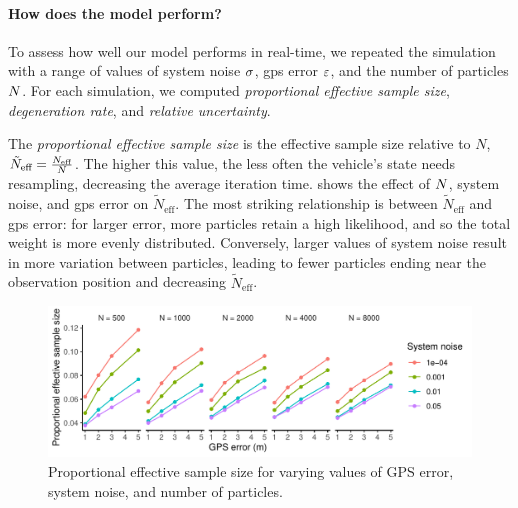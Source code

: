 \paragraph{How does the model perform?}





To assess how well our model performs in real-time, we repeated the simulation with a range of values of system noise $\sigma$, \gls{gps} error $\varepsilon$, and the number of particles $N$. For each simulation, we computed \emph{proportional effective sample size}, \emph{degeneration rate}, and \emph{relative uncertainty}.

The \emph{proportional effective sample size} is the effective sample size relative to $N$, $\tilde N_\text{eff} = \frac{N_\text{eff}}{N}$. The higher this value, the less often the vehicle's state needs resampling, decreasing the average iteration time.  shows the effect of $N$, system noise, and \gls{gps} error on $\tilde N_\text{eff}$. The most striking relationship is between $\tilde N_\text{eff}$ and \gls{gps} error: for larger error, more particles retain a high likelihood, and so the total weight is more evenly distributed. Conversely, larger values of system noise result in more variation between particles, leading to fewer particles ending near the observation position and decreasing $\tilde N_\text{eff}$.

\begin{knitrout}\small
{}\color{fgcolor}\begin{figure}

{\centering \includegraphics[width=\textwidth]{figure/model_performance_neff-1} 

}

\caption[Proportional effective sample size for varying values of GPS error, system noise, and number of particles]{Proportional effective sample size for varying values of GPS error, system noise, and number of particles.}\label{fig:model_performance_neff}
\end{figure}


\end{knitrout}


